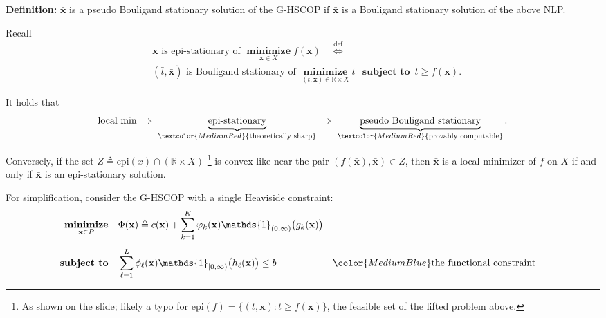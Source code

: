\documentclass[aspectratio=169,xcolor=dvipsnames]{beamer}
\begin{document}
\begin{frame}
  \small
  \setlength{\abovedisplayskip}{5pt}
  \setlength{\belowdisplayskip}{5pt}

  \textbf{Definition:} $\bar{\mathbf{x}}$ is a
  {\color{MediumBlue}pseudo Bouligand stationary} solution of the G-HSCOP if
  $\bar{\mathbf{x}}$ is a Bouligand stationary solution of the above NLP.

  \vspace{0.06cm}
  \textcolor{MediumRed}{Recall}
  \[
    \begin{aligned}
      &\bar{\mathbf{x}}\text{ is epi-stationary of }
        \operatorname*{\textbf{minimize}}_{\mathbf{x}\in X}f(\mathbf{x})
        \quad\overset{\text{def}}{\Longleftrightarrow}\\[2pt]
      &(\bar{t},\bar{\mathbf{x}})\text{ is Bouligand stationary of }
        \operatorname*{\textbf{minimize}}_{(t,\mathbf{x})\in\mathbb{R}\times X}
        t\ \ \operatorname*{\textbf{subject to}}\ t\geq f(\mathbf{x}).
    \end{aligned}
  \]

  \vspace{0.02cm}
  It holds that
  \[
    \text{local min}\ \Rightarrow\
    \underbrace{\text{epi-stationary}}_{
      \textcolor{MediumRed}{\text{theoretically sharp}}}
    \ \Rightarrow\
    \underbrace{\text{pseudo Bouligand stationary}}_{
      \textcolor{MediumRed}{\text{provably computable}}}.
  \]

  \vspace{0.04cm}
  Conversely, if the set
  $Z\triangleq\mathrm{epi}(x)\cap(\mathbb{R}\times X)$%
  \footnote{\scriptsize As shown on the slide; likely a typo for
    $\mathrm{epi}(f)=\{(t,\mathbf{x}):t\geq f(\mathbf{x})\}$, the feasible set
    of the lifted problem above.}
  is convex-like near the pair
  $(f(\bar{\mathbf{x}}),\bar{\mathbf{x}})\in Z$, then $\bar{\mathbf{x}}$
  is a local minimizer of $f$ on $X$ if and only if $\bar{\mathbf{x}}$ is an
  epi-stationary solution.
\end{frame}

\begin{frame}
  \small
  \setlength{\abovedisplayskip}{6pt}
  \setlength{\belowdisplayskip}{6pt}

  For simplification, consider the G-HSCOP with a single Heaviside
  constraint:
  \[
    \begin{aligned}
      \operatorname*{\textbf{minimize}}_{\mathbf{x}\in P}\quad
      &\Phi(\mathbf{x})\triangleq c(\mathbf{x})
        +\sum_{k=1}^{K}\varphi_k(\mathbf{x})
        \mathds{1}_{(0,\infty)}\bigl(g_k(\mathbf{x})\bigr)\\[4pt]
      \operatorname*{\textbf{subject to}}\quad
      &\sum_{\ell=1}^{L}\phi_\ell(\mathbf{x})
        \mathds{1}_{[0,\infty)}\bigl(h_\ell(\mathbf{x})\bigr)\leq b
        &&{\color{MediumBlue}\text{the functional constraint}}
    \end{aligned}
  \]
\end{frame}
\end{document}
